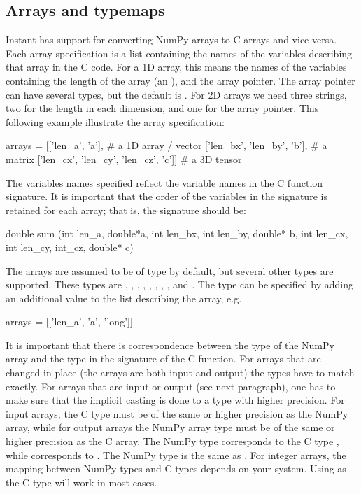\subsection{Arrays and typemaps}\label{wilbers:sec:arrays}

Instant has support for converting NumPy arrays to C arrays and vice
versa. Each array specification is a list containing the names of the
variables describing that array in the C code. For a 1D array, this
means the names of the variables containing the length of the array
(an ), and the array pointer. The array pointer can have
several types, but the default is . For 2D arrays we need
three strings, two for the length in each dimension, and one for the
array pointer. This following example illustrate the array
specification:
\begin{python}
arrays = [['len_a', 'a'],                        # a 1D array / vector
          ['len_bx', 'len_by', 'b'],           # a matrix
          ['len_cx', 'len_cy', 'len_cz', 'c']] # a 3D tensor
\end{python}
The variables names specified reflect the variable names in the C function
signature. It is important that the order of the variables in the signature is
retained for each array; that is, the signature should be:
\begin{c++}
double sum (int len_a, double*a,
	          int len_bx, int len_by, double* b,
	          int len_cx, int len_cy, int_cz, double* c)
\end{c++}
The arrays are assumed to be of type  by default, but
several other types are supported. These types
are , , , , , , , ,
and . The type can be specified by adding an
additional value to the list describing the array, e.g.
\begin{python}
arrays = [['len_a', 'a', 'long']]
\end{python}
It is important that there is correspondence between the type of the
NumPy array and the type in the signature of the C function. For
arrays that are changed in-place (the arrays are both
input and output) the types have to match exactly. For
arrays that are input or output (see next paragraph), one has to make
sure that the implicit casting is done to a type with higher
precision. For input arrays, the C type must be of the same or higher
precision as the NumPy array, while for output arrays the NumPy array
type must be of the same or higher precision as the C array. The
NumPy type  corresponds to the C type ,
while  corresponds to . The NumPy
type  is the same as . For integer arrays, the
mapping between NumPy types and C types depends on your
system. Using  as the C type will work in most cases.

